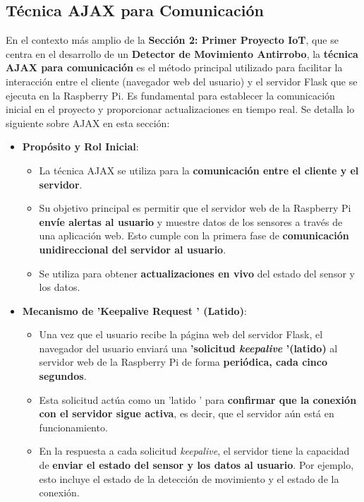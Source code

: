 \documentclass{report}
\begin{document}
\subsection{Técnica AJAX para Comunicación}
En el contexto más amplio de la \textbf{Sección 2: Primer Proyecto IoT}, que se centra en el desarrollo de un \textbf{Detector de Movimiento Antirrobo}, 
la \textbf{técnica AJAX para comunicación} es el método principal utilizado para facilitar la interacción entre el cliente (navegador web del usuario) 
y el servidor Flask que se ejecuta en la Raspberry Pi. Es fundamental para establecer la comunicación inicial en el proyecto y proporcionar 
actualizaciones en tiempo real. Se detalla lo siguiente sobre AJAX en esta sección:

\begin{itemize}
    \item \textbf{Propósito y Rol Inicial}:
    \begin{itemize}
        \item La técnica AJAX se utiliza para la \textbf{comunicación entre el cliente y el servidor}.
        \item Su objetivo principal es permitir que el servidor web de la Raspberry Pi \textbf{envíe alertas al usuario} y muestre datos de los sensores 
        a través de una aplicación web. Esto cumple con la primera fase de \textbf{comunicación unidireccional del servidor al usuario}.
        \item Se utiliza para obtener \textbf{actualizaciones en vivo} del estado del sensor y los datos.
    \end{itemize}

    \item \textbf{Mecanismo de  'Keepalive Request ' (Latido)}:
    \begin{itemize}
        \item Una vez que el usuario recibe la página web del servidor Flask, el navegador del usuario enviará una \textbf{ 'solicitud \textit{keepalive} 
        '(latido)} al servidor web de la Raspberry Pi de forma \textbf{periódica, cada cinco segundos}.
        \item Esta solicitud actúa como un  'latido ' para \textbf{confirmar que la conexión con el servidor sigue activa}, es decir, que el servidor 
        aún está en funcionamiento.
        \item En la respuesta a cada solicitud \textit{keepalive}, el servidor tiene la capacidad de \textbf{enviar el estado del sensor y los datos 
        al usuario}. Por ejemplo, esto incluye el estado de la detección de movimiento y el estado de la conexión.
    \end{itemize}


\end{itemize}
\end{document}
